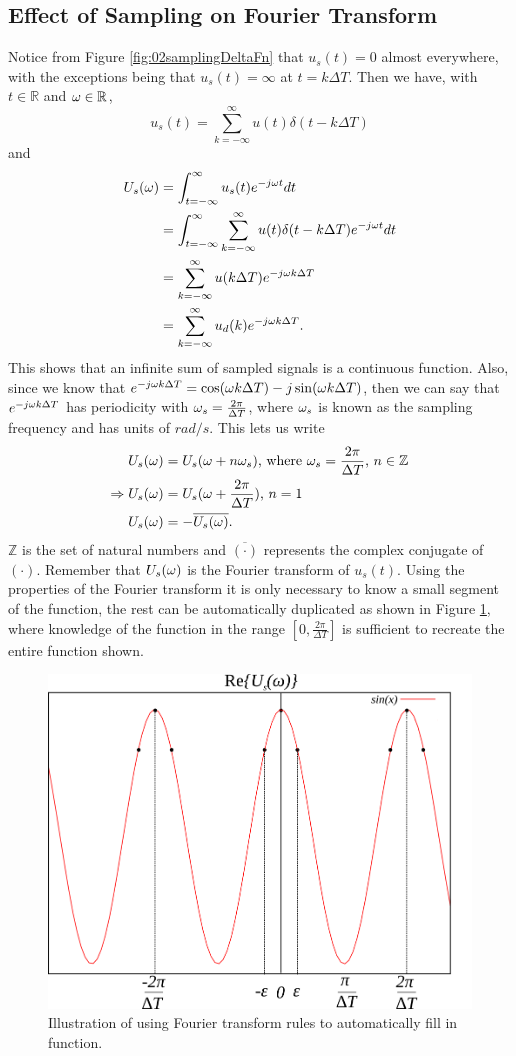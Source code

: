 \subsection{Effect of Sampling on Fourier Transform}
Notice from Figure \ref{fig:02samplingDeltaFn} that $u_s(t) = 0$ almost everywhere, with the exceptions being that $u_s(t) = \infty$ at $t=k\Delta T$. Then we have, with $t\in\mathbb{R}$ and $\omega\in\mathbb{R}$,
$$u_s(t) = \sum_{k=-\infty}^\infty u(t)\delta(t-k\Delta T)$$
and
\begin{align*}
U_s(\omega) &= \int_{t=-\infty}^\infty u_s(t)e^{-j\omega t} dt \\
&= \int_{t=-\infty}^\infty \sum_{k=-\infty}^\infty u(t)\delta(t-k\Delta T)e^{-j\omega t} dt \\
&= \sum_{k=-\infty}^\infty u(k\Delta T) e^{-j\omega k\Delta T} \\
&= \sum_{k=-\infty}^\infty u_d(k) e^{-j\omega k\Delta T}.
\end{align*}
This shows that an infinite sum of sampled signals is a continuous function. Also, since we know that $e^{-j\omega k\Delta T} = \cos(\omega k\Delta T) - j\sin(\omega k\Delta T)$, then we can say that $e^{-j\omega k\Delta T}$ has periodicity with $\omega_s = \frac{2\pi}{\Delta T}$, where $\omega_s$ is known as the sampling frequency and has units of $rad/s$. This lets us write
\begin{align*}
U_s(\omega) &= U_s(\omega+n\omega_s) \text{, where } \omega_s = \frac{2\pi}{\Delta T} \text{, } n\in\mathbb{Z} \\
\Rightarrow U_s(\omega) &= U_s(\omega+\frac{2\pi}{\Delta T}) \text{, } n=1 \\
U_s(\omega) &= -\overline{U_s(\omega)}.
\end{align*}
$\mathbb{Z}$ is the set of natural numbers and $\overline{(\cdot)}$ represents the complex conjugate of $(\cdot)$. Remember that $U_s(\omega)$ is the Fourier transform of $u_s(t)$. Using the properties of the Fourier transform it is only necessary to know a small segment of the function, the rest can be automatically duplicated as shown in Figure \ref{fig:02sin}, where knowledge of the function in the range $[0,\frac{2\pi}{\Delta T}]$ is sufficient to recreate the entire function shown.
\begin{figure}[ht!]
	\centering
	\includegraphics[width=.3\textwidth]{images/02sin}
	\caption{Illustration of using Fourier transform rules to automatically fill in function.}
	\label{fig:02sin}
\end{figure}

